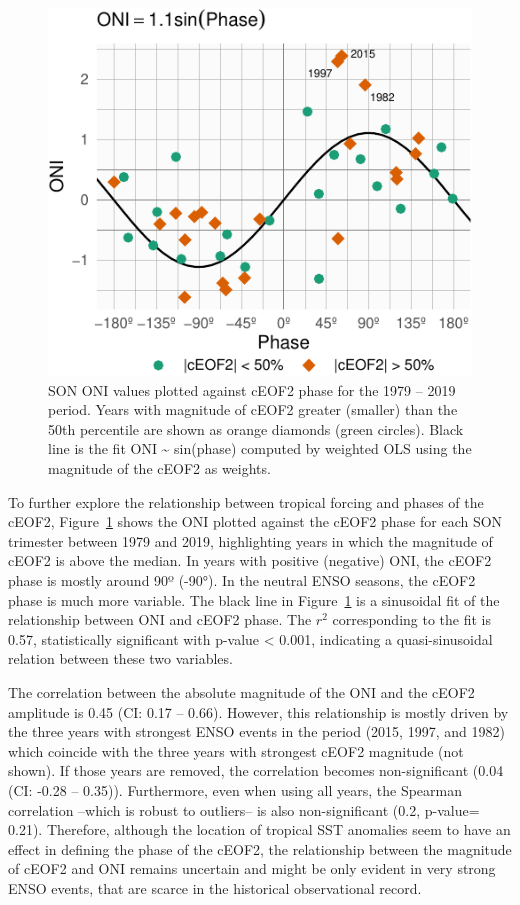 \documentclass[pdflatex,sn-basic]{sn-jnl}
\theoremstyle{thmstyleone}%
\theoremstyle{thmstyletwo}%
\theoremstyle{thmstylethree}%
\begin{document}
\begin{figure}
\centering
\includegraphics{../figures/enso-phase-1.pdf}
\caption{\label{fig:enso-phase}SON ONI values plotted against cEOF2 phase for the 1979 -- 2019 period. Years with magnitude of cEOF2 greater (smaller) than the 50th percentile are shown as orange diamonds (green circles). Black line is the fit ONI \textasciitilde{} sin(phase) computed by weighted OLS using the magnitude of the cEOF2 as weights.}
\end{figure}

To further explore the relationship between tropical forcing and phases of the cEOF2, Figure~\ref{fig:enso-phase} shows the ONI plotted against the cEOF2 phase for each SON trimester between 1979 and 2019, highlighting years in which the magnitude of cEOF2 is above the median.
In years with positive (negative) ONI, the cEOF2 phase is mostly around 90º (-90°).
In the neutral ENSO seasons, the cEOF2 phase is much more variable.
The black line in Figure~\ref{fig:enso-phase} is a sinusoidal fit of the relationship between ONI and cEOF2 phase.
The \(r^2\) corresponding to the fit is 0.57, statistically significant with p-value \textless{} 0.001, indicating a quasi-sinusoidal relation between these two variables.

The correlation between the absolute magnitude of the ONI and the cEOF2 amplitude is 0.45 (CI: 0.17 -- 0.66).
However, this relationship is mostly driven by the three years with strongest ENSO events in the period (2015, 1997, and 1982) which coincide with the three years with strongest cEOF2 magnitude (not shown).
If those years are removed, the correlation becomes non-significant (0.04 (CI: -0.28 -- 0.35)).
Furthermore, even when using all years, the Spearman correlation --which is robust to outliers-- is also non-significant (0.2, p-value= 0.21).
Therefore, although the location of tropical SST anomalies seem to have an effect in defining the phase of the cEOF2, the relationship between the magnitude of cEOF2 and ONI remains uncertain and might be only evident in very strong ENSO events, that are scarce in the historical observational record.
\end{document}
